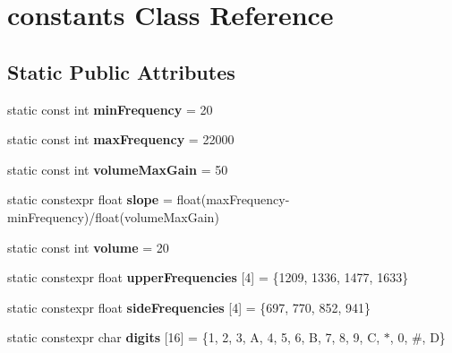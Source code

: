 \hypertarget{classconstants}{}\section{constants Class Reference}
\label{classconstants}
\subsection*{Static Public Attributes}
\begin{DoxyCompactItemize}
\item 
\mbox{\label{classconstants_a84f8979468be4806839b420532e66a13}} 
static const int {\bfseries min\+Frequency} = 20
\item 
\mbox{\label{classconstants_a0bb21d4c1c8904e94b95240808a172d2}} 
static const int {\bfseries max\+Frequency} = 22000
\item 
\mbox{\label{classconstants_a780fc786abe4160ffbe996ef3aa265ae}} 
static const int {\bfseries volume\+Max\+Gain} = 50
\item 
\mbox{\label{classconstants_afa42f02e9f1cf1de061bf8c235a8dd49}} 
static constexpr float {\bfseries slope} = float(max\+Frequency-\/min\+Frequency)/float(volume\+Max\+Gain)
\item 
\mbox{\label{classconstants_ac658248f815f0c00daa6a240b48c6337}} 
static const int {\bfseries volume} = 20
\item 
\mbox{\label{classconstants_a86a4c369edb500e998a239eb90829a2c}} 
static constexpr float {\bfseries upper\+Frequencies} \mbox{[}4\mbox{]} = \{1209, 1336, 1477, 1633\}
\item 
\mbox{\label{classconstants_a5e4b398a09b427e74bb49ae5dcffd03e}} 
static constexpr float {\bfseries side\+Frequencies} \mbox{[}4\mbox{]} = \{697, 770, 852, 941\}
\item 
\mbox{\label{classconstants_a1229e9e903a55dd2a0df943cce860c5f}} 
static constexpr char {\bfseries digits} \mbox{[}16\mbox{]} = \{\textquotesingle{}1\textquotesingle{}, \textquotesingle{}2\textquotesingle{}, \textquotesingle{}3\textquotesingle{}, \textquotesingle{}A\textquotesingle{}, \textquotesingle{}4\textquotesingle{}, \textquotesingle{}5\textquotesingle{}, \textquotesingle{}6\textquotesingle{}, \textquotesingle{}B\textquotesingle{}, \textquotesingle{}7\textquotesingle{}, \textquotesingle{}8\textquotesingle{}, \textquotesingle{}9\textquotesingle{}, \textquotesingle{}C\textquotesingle{}, \textquotesingle{}$\ast$\textquotesingle{}, \textquotesingle{}0\textquotesingle{}, \textquotesingle{}\#\textquotesingle{}, \textquotesingle{}D\textquotesingle{}\}

\end{DoxyCompactItemize}

